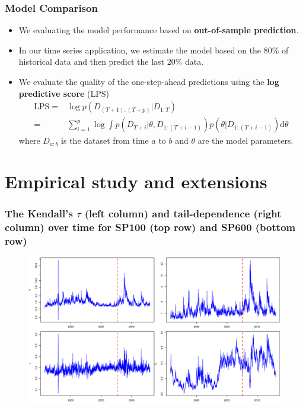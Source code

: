 \documentclass{beamer}
\begin{document}
\begin{frame}
  \frametitle{Model Comparison}
  \begin{itemize}
  \item We evaluating the model performance based on \textbf{out-of-sample prediction}.
  \item In our time series application, we estimate the model based on the 80\% of
    historical data and then predict the last 20\% data.

  \item We evaluate the quality of the one-step-ahead predictions using the \textbf{log
      predictive score} (LPS)
    \begin{align*}
      \mathrm{LPS}=&\log p(D_{(T+1):(T+p)}|D_{1:T})\\
      =&\sum\nolimits _{i=1}^{p}\log\int p(D_{T+i}|\theta,D_{1:(T+i-1)})p(\theta|D_{1:(T+i-1)})\mathrm{d}\theta
    \end{align*}
    where $D_{a:b}$ is the dataset from time $a$ to $b$ and $\theta$ are the model
    parameters.
  \end{itemize}
\end{frame}


\section{Empirical study and extensions}

\begin{frame}[plain]
  \addtocounter{framenumber}{-1}

  \begin{center}
    {\Large {}}
  \end{center}
\end{frame}

\begin{frame}
  \frametitle{The Kendall's $\tau$ (left column) and tail-dependence (right column) over
    time for SP100 (top row) and SP600 (bottom row)}
  \begin{figure}
    \centering
    \hspace{-1cm}\includegraphics[height=0.4\textheight]{var-post}\\
    \hspace{-1cm}\includegraphics[height=0.41\textheight]{tau-post}
  \end{figure}
\end{frame}
\end{document}
